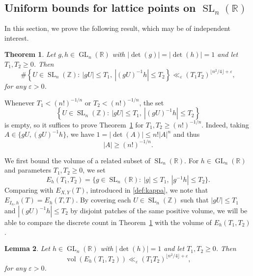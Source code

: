 \documentclass[11pt,reqno]{amsart}
\newtheorem{thm}{Theorem}
\newtheorem{lem}[thm]{Lemma}
\theoremstyle{definition}
\theoremstyle{remark}
\newcommand{\vol}{\operatorname{vol}}
\newcommand{\GL}{\operatorname{GL}}
\newcommand{\SL}{\operatorname{SL}}
\numberwithin{equation}{section}
\numberwithin{thm}{section}
\numberwithin{table}{section}
\def \R {{\mathbb R}}
\def \Z {{\mathbb Z}}
\newcommand{\eps}{\varepsilon}
\begin{document}
\subsection{Uniform bounds for lattice points on
  \texorpdfstring{$\SL_n(\R)$}{SLₙ(R)}}
\label{section:boundingnumberofbases}

In this section, we prove the following result, which may be of independent interest. 

\begin{thm}\label{thm:uniformlatticecount}
Let $g,h \in \GL_n(\R)$ with $|\det(g)|=|\det(h)|=1$ and let $T_1, T_2 \ge 0$. Then 
    \[
    \# 
    \left\{
    U \in \SL_n(\Z):~|gU| \le T_1,~|(gU)^{-1}h|\le T_2 
    \right\} \ll_{\varepsilon} (T_1 T_2)^{\lfloor n^2/4 \rfloor + \varepsilon} ,
    \]
    for any $\eps>0$.
\end{thm}

Whenever $T_1 < (n!)^{-1/n}$ or $T_2 < (n!)^{-1/n}$, the set 
\[
\left\{
    U \in \SL_n(\Z):~|gU| \le T_1,~|(gU)^{-1}h|\le T_2 
    \right\} 
\]
is empty, 
so it suffices to prove Theorem~\ref{thm:uniformlatticecount} for  $T_1,T_2 \ge (n!)^{-1/n}$. Indeed, taking $A \in \{gU, (gU)^{-1}h \}$, we have $1 = |\det(A)| \le n! |A|^n$ and thus 
\begin{equation}\label{eq:lowerboundsuchthatEhnonempty}
    |A|\ge (n!)^{-1/n}.
\end{equation}


We first bound the volume of a related subset of $\SL_n(\R)$. For $h \in \GL_n(\R)$ and parameters $T_1,T_2 \ge 0$, we set 
\[
    E_h(T_1, T_2) = 
    \{
    g \in \SL_n(\R):~|g|\le T_1, ~ |g^{-1}h|\le T_2
    \}.
\]
Comparing with $E_{X,Y}(T)$, introduced in \eqref{def:kappa}, we note that
$E_{I_n,h}(T) = E_h(T,T)$.
By covering each $U \in \SL_n(\Z)$ such  that $|gU|\le T_1$ and $|(gU)^{-1}h| \le T_2$ 
by disjoint patches of the same positive volume, we will be able to  compare the discrete count in Theorem~\ref{thm:uniformlatticecount} with the volume of $E_{h}(T_1,T_2)$. 



\begin{lem}\label{lem:volumeuniformbound}
    Let $h \in \GL_n(\R)$ with $|\det(h)| =1$ and let $T_1,T_2\geq 0$. Then 
    \[
    \vol (E_h(T_1,T_2)) \ll_{\varepsilon} (T_1 T_2)^{\lfloor n^2/4 \rfloor+\varepsilon},
    \]
    for any $\eps>0$.
\end{lem}
\end{document}
